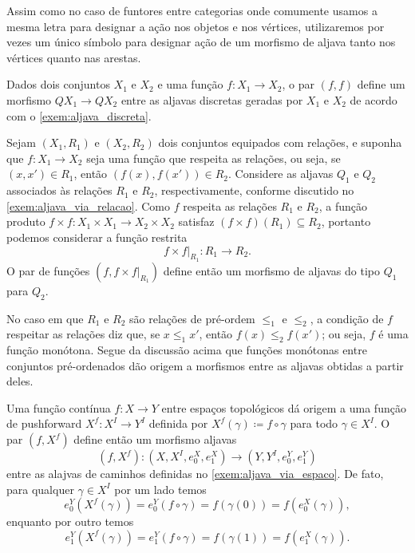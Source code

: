 Assim como no caso de funtores entre categorias onde comumente usamos a mesma letra para designar a ação nos objetos e nos vértices, utilizaremos por vezes um único símbolo para designar ação de um morfismo de aljava tanto nos vértices quanto nas arestas.

\begin{exem}
    Dados dois conjuntos $X_1$ e $X_2$ e uma função $f: X_1 \to X_2$, o par $(f,f)$ define um morfismo $QX_1 \to QX_2$ entre as aljavas discretas geradas por $X_1$ e $X_2$ de acordo com o \cref{exem:aljava_discreta}.
\end{exem}

\begin{exem}
    Sejam $(X_1,R_1)$ e $(X_2,R_2)$ dois conjuntos equipados com relações, e suponha que $f: X_1 \to X_2$ seja uma função que respeita as relações, ou seja, se $(x,x') \in R_1$, então $(f(x),f(x')) \in R_2$.
    Considere as aljavas $Q_1$ e $Q_2$ associados às relações $R_1$ e $R_2$, respectivamente, conforme discutido no \cref{exem:aljava_via_relacao}.
    Como $f$ respeita as relações $R_1$ e $R_2$, a função produto $f \times f: X_1 \times X_1 \to X_2 \times X_2$ satisfaz $(f \times f)(R_1) \subseteq R_2$, portanto podemos considerar a função restrita
    \begin{displaymath}
        f \times f \rvert_{R_1}: R_1 \to R_2.
    \end{displaymath}
    O par de funções $(f,f \times f\rvert_{R_1})$ define então um morfismo de aljavas do tipo $Q_1$ para $Q_2$.

    No caso em que $R_1$ e $R_2$ são relações de pré-ordem $\leq_1$ e $\leq_2$, a condição de $f$ respeitar as relações diz que, se $x \leq_1 x'$, então $f(x) \leq_2 f(x')$; ou seja, $f$ é uma função monótona.
    Segue da discussão acima que funções monótonas entre conjuntos pré-ordenados dão origem a morfismos entre as aljavas obtidas a partir deles.
\end{exem}

\begin{exem}
    Uma função contínua $f: X \to Y$ entre espaços topológicos dá origem a uma função de pushforward $X^f: X^I \to Y^{I}$ definida por $X^f(\gamma) \coloneqq f \circ \gamma$ para todo $\gamma \in X^{I}$.
    O par $(f,X^f)$ define então um morfismo aljavas
    \begin{displaymath}
        (f,X^f): (X,X^I,e^X_0,e^X_1) \to (Y,Y^I,e^Y_0,e^Y_1)
    \end{displaymath}
    entre as alajvas de caminhos definidas no \cref{exem:aljava_via_espaco}.
    De fato, para qualquer $\gamma \in X^I$ por um lado temos
    \begin{displaymath}
        e^Y_0(X^f(\gamma)) = e^Y_0(f \circ \gamma) = f(\gamma(0)) = f(e^X_0(\gamma)),
    \end{displaymath}
    enquanto por outro temos
    \begin{displaymath}
        e^Y_1(X^f(\gamma)) = e^Y_1(f \circ \gamma) = f(\gamma(1)) = f(e^X_1(\gamma)).
    \end{displaymath}
\end{exem}

